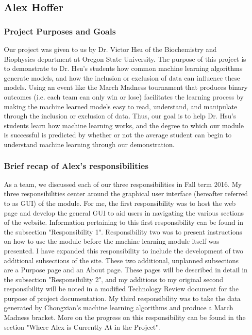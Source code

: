\documentclass[letterpaper, 10pt,titlepage]{article}
\begin{document}
\subsection{Alex Hoffer}

\subsubsection{Project Purposes and Goals}
\par Our project was given to us by Dr. Victor Hsu of the Biochemistry and Biophysics department at Oregon State University. The purpose of this project is to demonstrate to Dr. Hsu's students how common machine learning algorithms generate models, and how the inclusion or exclusion of data can influence these models. Using an event like the March Madness tournament that produces binary outcomes (i.e. each team can only win or lose) facilitates the learning process by making the machine learned models easy to read, understand, and manipulate through the inclusion or exclusion of data. Thus, our goal is to help Dr. Hsu's students learn how machine learning works, and the degree to which our module is successful is predicted by whether or not the average student can begin to understand machine learning through our demonstration. 

\subsubsection{Brief recap of Alex's responsibilities}
\par As a team, we discussed each of our three responsibilities in Fall term 2016. My three responsibilities center around the graphical user interface (hereafter referred to as GUI) of the module. For me, the first responsibility was to host the web page and develop the general GUI to aid users in navigating the various sections of the website. Information pertaining to this first responsibility can be found in the subsection "Responsibility 1". Responsibility two was to present instructions on how to use the module before the machine learning module itself was presented. I have expanded this responsibility to include the development of two additional subsections of the site. These two additional, unplanned subsections are a Purpose page and an About page. These pages will be described in detail in the subsection "Responsibility 2", and my additions to my original second responsibility will be noted in a modified Technology Review document for the purpose of project documentation. My third responsibility was to take the data generated by Chongxian's machine learning algorithms and produce a March Madness bracket. More on the progress on this responsibility can be found in the section "Where Alex is Currently At in the Project". 
   
\end{document}
